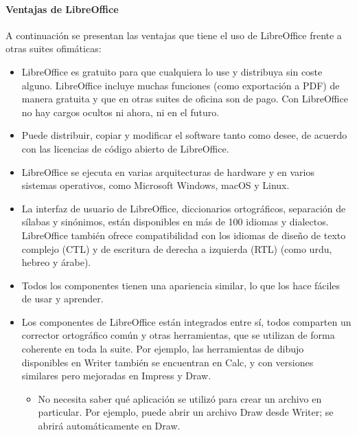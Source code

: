 \documentclass[letterpaper,10pt,spanish]{sphinxmanual}
\begin{document}
\paragraph{Ventajas de LibreOffice}
\label{\detokenize{cursos/ofimatica10/recursos/T03:ventajas-de-libreoffice}}
\sphinxAtStartPar
\sphinxfootnotemark[1] A continuación se presentan las ventajas que tiene el uso de LibreOffice frente a otras suites ofimáticas:
\begin{itemize}
\item {} 
\sphinxAtStartPar
{} LibreOffice es gratuito para que cualquiera lo use y distribuya sin coste alguno. LibreOffice incluye muchas funciones (como exportación a PDF) de manera gratuita y que en otras suites de oficina son de pago. Con LibreOffice no hay cargos ocultos ni ahora, ni en el futuro.

\item {} 
\sphinxAtStartPar
{} Puede distribuir, copiar y modificar el software tanto como desee, de acuerdo con las licencias de código abierto de LibreOffice.

\item {} 
\sphinxAtStartPar
{} LibreOffice se ejecuta en varias arquitecturas de hardware y en varios sistemas operativos, como Microsoft Windows, macOS y Linux.

\item {} 
\sphinxAtStartPar
{} La interfaz de usuario de LibreOffice, diccionarios ortográficos, separación de sílabas y sinónimos, están disponibles en más de 100 idiomas y dialectos. LibreOffice también ofrece compatibilidad con los idiomas de diseño de texto complejo (CTL) y de escritura de derecha a izquierda (RTL) (como urdu, hebreo y árabe).

\item {} 
\sphinxAtStartPar
{} Todos los componentes tienen una apariencia similar, lo que los hace fáciles de usar y aprender.

\item {} 
\sphinxAtStartPar
{} Los componentes de LibreOffice están integrados entre sí, todos comparten un corrector ortográfico común y otras herramientas, que se utilizan de forma coherente en toda la suite. Por ejemplo, las herramientas de dibujo disponibles en Writer también se encuentran en Calc, y con versiones similares pero mejoradas en Impress y Draw.
\begin{itemize}
\item {} 
\sphinxAtStartPar
No necesita saber qué aplicación se utilizó para crear un archivo en particular. Por ejemplo, puede abrir un archivo Draw desde Writer; se abrirá automáticamente en Draw.


\end{itemize}
\end{itemize}
\end{document}
